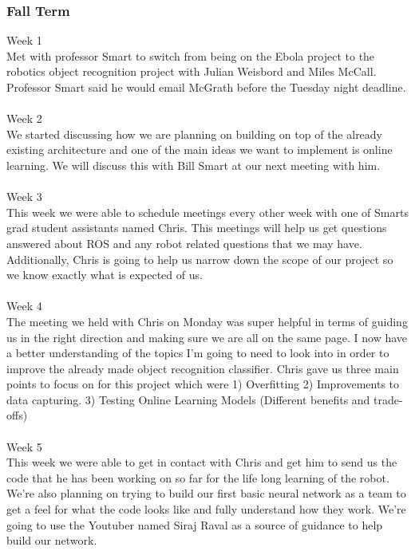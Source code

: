 \documentclass[draftclsnofoot, onecolumn, 10pt, compsoc]{IEEEtran}
\begin{document}
  \subsubsection{Fall Term}
    Week 1 \\
\indent Met with professor Smart to switch from being on the Ebola project to the robotics object recognition 
project with Julian Weisbord and Miles McCall. Professor Smart said he would email McGrath before the Tuesday night deadline. \\\\
  Week 2 \\
\indent We started discussing how we are planning on building on top of the already existing architecture and one of the main ideas we want to implement is online learning. We will discuss this with Bill Smart at our next meeting with him. \\\\
  Week 3 \\
\indent This week we were able to schedule meetings every other week with one of Smarts grad student assistants  named Chris. This meetings will help us get questions answered about ROS and any robot related questions that we may have. Additionally, Chris is going to help us narrow down the scope of our project so we know exactly what is expected of us.  \\\\
  Week 4 \\
\indent The meeting we held with Chris on Monday was super helpful in terms of guiding us in the right direction and making sure we are all on the same page. I now have a better understanding of the topics I'm going to need to look into in order to improve the already made object recognition classifier. Chris gave us three main points to focus on for this project which were 1) Overfitting 2)  Improvements to data capturing. 3) Testing Online Learning Models (Different benefits and trade-offs) \\\\
  Week 5 \\
\indent This week we were able to get in contact with Chris and get him to send us the code that he has been working on so far for the life long learning of the robot. We're also planning on trying to build our first basic neural network as a team to get a feel for what the code looks like and fully understand how they work. We're going to use the Youtuber named Siraj Raval as a source of guidance to help build our network.\\\\
\end{document}
